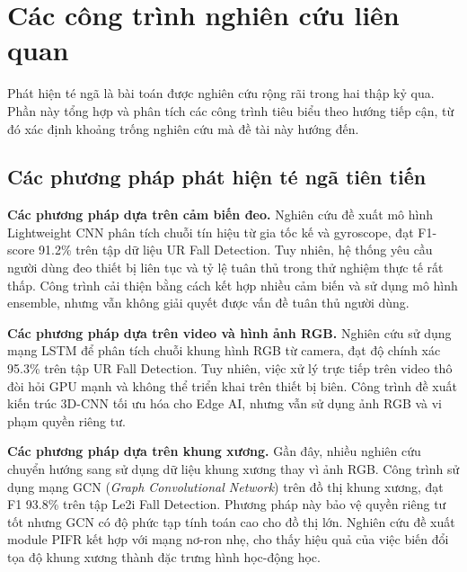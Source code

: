 
\section{Các công trình nghiên cứu liên quan}
\label{sec:related_works}

Phát hiện té ngã là bài toán được nghiên cứu rộng rãi trong hai thập kỷ qua. Phần này tổng hợp và phân tích các công trình tiêu biểu theo hướng tiếp cận, từ đó xác định khoảng trống nghiên cứu mà đề tài này hướng đến.

\subsection{Các phương pháp phát hiện té ngã tiên tiến}
\label{sec:advanced_methods}

\textbf{Các phương pháp dựa trên cảm biến đeo.} Nghiên cứu \cite{pham2025lightweight} đề xuất mô hình Lightweight CNN phân tích chuỗi tín hiệu từ gia tốc kế và gyroscope, đạt F1-score 91.2\% trên tập dữ liệu UR Fall Detection. Tuy nhiên, hệ thống yêu cầu người dùng đeo thiết bị liên tục và tỷ lệ tuân thủ trong thử nghiệm thực tế rất thấp. Công trình \cite{khawam2025fall} cải thiện bằng cách kết hợp nhiều cảm biến và sử dụng mô hình ensemble, nhưng vẫn không giải quyết được vấn đề tuân thủ người dùng.

\textbf{Các phương pháp dựa trên video và hình ảnh RGB.} Nghiên cứu \cite{benabdennour2026real} sử dụng mạng LSTM để phân tích chuỗi khung hình RGB từ camera, đạt độ chính xác 95.3\% trên tập UR Fall Detection. Tuy nhiên, việc xử lý trực tiếp trên video thô đòi hỏi GPU mạnh và không thể triển khai trên thiết bị biên. Công trình \cite{kurniadi2026human} đề xuất kiến trúc 3D-CNN tối ưu hóa cho Edge AI, nhưng vẫn sử dụng ảnh RGB và vi phạm quyền riêng tư.

\textbf{Các phương pháp dựa trên khung xương.} Gần đây, nhiều nghiên cứu chuyển hướng sang sử dụng dữ liệu khung xương thay vì ảnh RGB. Công trình \cite{khani2024skeleton} sử dụng mạng GCN (\textit{Graph Convolutional Network}) trên đồ thị khung xương, đạt F1 93.8\% trên tập Le2i Fall Detection. Phương pháp này bảo vệ quyền riêng tư tốt nhưng GCN có độ phức tạp tính toán cao cho đồ thị lớn. Nghiên cứu \cite{kong2025pifr} đề xuất module PIFR kết hợp với mạng nơ-ron nhẹ, cho thấy hiệu quả của việc biến đổi tọa độ khung xương thành đặc trưng hình học-động học.

